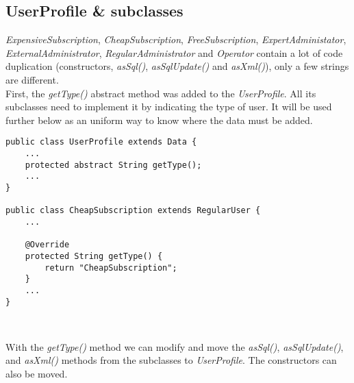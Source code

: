 \subsection{UserProfile \& subclasses}

\emph{ExpensiveSubscription}, \emph{CheapSubscription},
\emph{FreeSubscription}, \emph{ExpertAdministator},
\emph{ExternalAdministrator}, \emph{RegularAdministrator} and
\emph{Operator} contain a lot of code duplication (constructors,
\emph{asSql()}, \emph{asSqlUpdate()} and \emph{asXml()}), only a few strings
are different.\\

First, the \emph{getType()} abstract method was added to the \emph{UserProfile}.
All its subclasses need to implement it by indicating the type of user.
It will be used further below as an uniform way to know where the data must be
added.\\

\begin{lstlisting}
public class UserProfile extends Data {
    ...
    protected abstract String getType();
    ...
}

public class CheapSubscription extends RegularUser {
    ...
    
    @Override
	protected String getType() {
		return "CheapSubscription";
	}
    ...
}
\end{lstlisting}
\

With the \emph{getType()} method we can modify and move the \emph{asSql()},
\emph{asSqlUpdate()}, and \emph{asXml()} methods from the subclasses to
\emph{UserProfile}. The constructors can also be moved.\\


